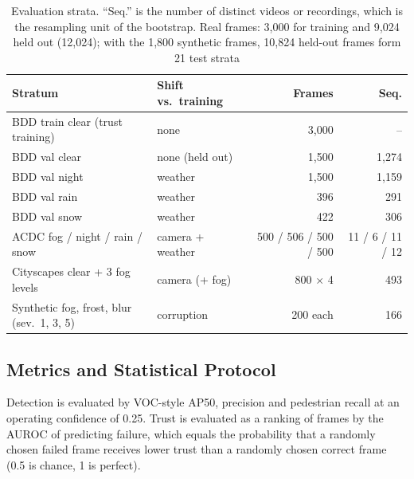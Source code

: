 \documentclass[pdflatex,sn-mathphys-num]{sn-jnl}
\begin{document}
\begin{table}[t]
\caption{Evaluation strata. ``Seq.'' is the number of distinct videos or recordings, which is the resampling unit of the bootstrap. Real frames: 3,000 for training and 9,024 held out (12,024); with the 1,800 synthetic frames, 10,824 held-out frames form 21 test strata}
\label{tab:strata}
\footnotesize
\begin{tabular}{@{}llrr@{}}
\toprule
Stratum & Shift vs.\ training & Frames & Seq. \\
\midrule
BDD train clear (trust training) & none & 3,000 & -- \\
BDD val clear & none (held out) & 1,500 & 1,274 \\
BDD val night & weather & 1,500 & 1,159 \\
BDD val rain & weather & 396 & 291 \\
BDD val snow & weather & 422 & 306 \\
ACDC fog / night / rain / snow & camera + weather & 500 / 506 / 500 / 500 & 11 / 6 / 11 / 12 \\
Cityscapes clear + 3 fog levels & camera (+ fog) & 800 $\times$ 4 & 493 \\
Synthetic fog, frost, blur (sev.\ 1, 3, 5) & corruption & 200 each & 166 \\
\bottomrule
\end{tabular}
\end{table}

\subsection{Metrics and Statistical Protocol}\label{sec:metrics}

Detection is evaluated by VOC-style AP50, precision and pedestrian recall at an operating confidence of 0.25. Trust is evaluated as a ranking of frames by the AUROC of predicting failure, which equals the probability that a randomly chosen failed frame receives lower trust than a randomly chosen correct frame (0.5 is chance, 1 is perfect).
\end{document}
